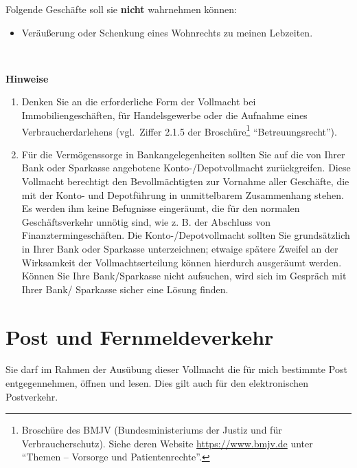 \documentclass[pdftex,12pt,a4paper]{article}
\begin{document}
Folgende Geschäfte soll sie \textbf{nicht} wahrnehmen können:

\begin{itemize}

\item Veräußerung oder Schenkung eines Wohnrechts zu meinen Lebzeiten.

\end{itemize}

~

\textbf{Hinweise}

\begin{enumerate}

\item Denken Sie an die erforderliche Form der Vollmacht bei Immobiliengeschäften, für Handelsgewerbe oder die
Aufnahme eines Verbraucherdarlehens (vgl.\ Ziffer 2.1.5 der 
Broschüre\footnote{Broschüre des BMJV (Bundesministeriums der Justiz und für 
Verbraucherschutz). Siehe deren Website \url{https://www.bmjv.de} unter \enquote{Themen -- Vorsorge und Patientenrechte}.} \enquote{Betreuungsrecht}).


\item Für die Vermögenssorge in Bankangelegenheiten sollten Sie auf die von Ihrer Bank oder Sparkasse angebotene
Konto-/Depotvollmacht zurückgreifen. Diese Vollmacht berechtigt den Bevollmächtigten zur Vornahme aller
Geschäfte, die mit der Konto- und Depotführung in unmittelbarem Zusammenhang stehen. Es werden ihm
keine Befugnisse eingeräumt, die für den normalen Geschäftsverkehr unnötig sind, wie z. B. der Abschluss von
Finanztermingeschäften. Die Konto-/Depotvollmacht sollten Sie grundsätzlich in Ihrer Bank oder Sparkasse
unterzeichnen; etwaige spätere Zweifel an der Wirksamkeit der Vollmachtserteilung können hierdurch
ausgeräumt werden. Können Sie Ihre Bank/Sparkasse nicht aufsuchen, wird sich im Gespräch mit Ihrer Bank/
Sparkasse sicher eine Lösung finden.

\end{enumerate}


\section{Post und Fernmeldeverkehr}

Sie darf im Rahmen der Ausübung dieser Vollmacht die für mich bestimmte Post
entgegennehmen, öffnen und lesen. Dies gilt auch für den elektronischen Postverkehr.
\end{document}
